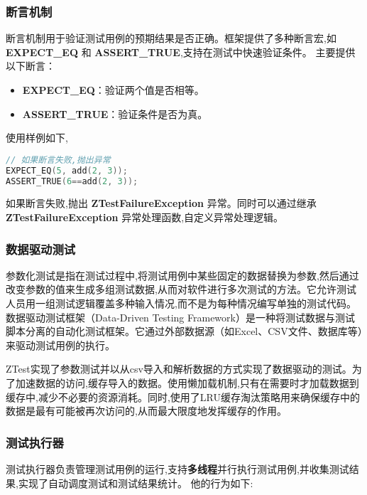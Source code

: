 \documentclass{article}
\begin{document}
\subsubsection{断言机制}
断言机制用于验证测试用例的预期结果是否正确。框架提供了多种断言宏,如 \textbf{EXPECT\_EQ} 和 \textbf{ASSERT\_TRUE},支持在测试中快速验证条件。
主要提供以下断言：
\begin{itemize}
    \item \textbf{EXPECT\_EQ}：验证两个值是否相等。
    \item \textbf{ASSERT\_TRUE}：验证条件是否为真。
\end{itemize}
使用样例如下,
\begin{lstlisting}[language=C++]
// 如果断言失败,抛出异常
EXPECT_EQ(5, add(2, 3));
ASSERT_TRUE(6==add(2, 3));
\end{lstlisting}

如果断言失败,抛出 \textbf{ZTestFailureException} 异常。同时可以通过继承 \textbf{ZTestFailureException} 异常处理函数,自定义异常处理逻辑。
\subsubsection{数据驱动测试}
参数化测试是指在测试过程中,将测试用例中某些固定的数据替换为参数,然后通过改变参数的值来生成多组测试数据,从而对软件进行多次测试的方法。它允许测试人员用一组测试逻辑覆盖多种输入情况,而不是为每种情况编写单独的测试代码。
数据驱动测试框架（Data-Driven Testing Framework）是一种将测试数据与测试脚本分离的自动化测试框架。它通过外部数据源（如Excel、CSV文件、数据库等）来驱动测试用例的执行。

ZTest实现了参数测试并以从csv导入和解析数据的方式实现了数据驱动的测试。为了加速数据的访问,缓存导入的数据。使用懒加载机制,只有在需要时才加载数据到缓存中,减少不必要的资源消耗。同时,使用了LRU缓存淘汰策略用来确保缓存中的数据是最有可能被再次访问的,从而最大限度地发挥缓存的作用。

\subsubsection{测试执行器}
测试执行器负责管理测试用例的运行,支持\textbf{多线程}并行执行测试用例,并收集测试结果,实现了自动调度测试和测试结果统计。
他的行为如下:
\begin{itemize}
    \item 并行运行safe测试。线程的创建和销毁是一个相对耗时的操作。使用线程池管理线程的生命周期通过复用线程,避免了频繁的线程创建和销毁,从而显著提高了系统的性能。
    \item 串行运行unsafe测试。通过队列来维护测试用例,保证测试用例的顺序执行。
    \item 串行运行Benchmark测试。
    \item 串行运行Parameterized测试。
\end{itemize}
\end{document}
